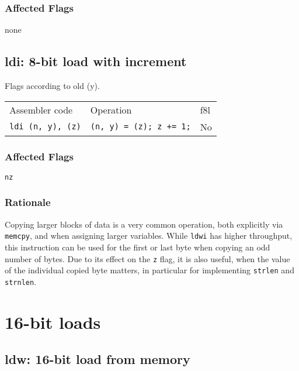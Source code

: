 \documentclass{book}
\begin{document}
\subsubsection*{Affected Flags}

none


\subsection{ldi: 8-bit load with increment}

Flags according to old (y).

\begin{tabular}{l l l}
Assembler code           & Operation                      & f8l \\
\texttt{ldi (n, y), (z)} & \texttt{(n, y) = (z); z += 1;} & No \\
\end{tabular}

\subsubsection*{Affected Flags}

\texttt{nz}

\subsubsection*{Rationale}

Copying larger blocks of data is a very common operation, both explicitly via \texttt{memcpy}, and when assigning larger variables. While \texttt{ldwi} has higher throughput, this instruction can be used for the first or last byte when copying an odd number of bytes. Due to its effect on the \texttt{z} flag, it is also useful, when the value of the individual copied byte matters, in particular for implementing \texttt{strlen} and \texttt{strnlen}.

\section{16-bit loads}

\subsection{ldw: 16-bit load from memory}
\end{document}
